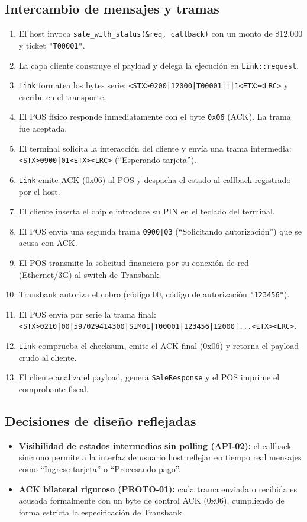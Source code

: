 \documentclass{../../plantilla/raysac-informe}
\begin{document}
\subsection{Intercambio de mensajes y tramas}
\begin{enumerate}
  \item El host invoca \texttt{sale\_with\_status(\&req, callback)} con un monto de \$12.000 y ticket \texttt{"T00001"}.
  \item La capa cliente construye el payload y delega la ejecución en \texttt{Link::request}.
  \item \texttt{Link} formatea los bytes serie: \texttt{<STX>0200|12000|T00001|||1<ETX><LRC>} y escribe en el transporte.
  \item El POS físico responde inmediatamente con el byte \texttt{0x06} (ACK). La trama fue aceptada.
  \item El terminal solicita la interacción del cliente y envía una trama intermedia:
    \texttt{<STX>0900|01<ETX><LRC>} (``Esperando tarjeta'').
  \item \texttt{Link} emite ACK (0x06) al POS y despacha el estado al callback registrado por el host.
  \item El cliente inserta el chip e introduce su PIN en el teclado del terminal.
  \item El POS envía una segunda trama \texttt{0900|03} (``Solicitando autorización'') que se acusa con ACK.
  \item El POS transmite la solicitud financiera por su conexión de red (Ethernet/3G) al switch de Transbank.
  \item Transbank autoriza el cobro (código 00, código de autorización \texttt{"123456"}).
  \item El POS envía por serie la trama final: \texttt{<STX>0210|00|597029414300|SIM01|T00001|123456|12000|...<ETX><LRC>}.
  \item \texttt{Link} comprueba el checksum, emite el ACK final (0x06) y retorna el payload crudo al cliente.
  \item El cliente analiza el payload, genera \texttt{SaleResponse} y el POS imprime el comprobante fiscal.
\end{enumerate}

\subsection{Decisiones de diseño reflejadas}
\begin{itemize}
  \item \textbf{Visibilidad de estados intermedios sin polling (API-02):} el callback síncrono permite
    a la interfaz de usuario host reflejar en tiempo real mensajes como ``Ingrese tarjeta'' o ``Procesando pago''.
  \item \textbf{ACK bilateral riguroso (PROTO-01):} cada trama enviada o recibida es acusada formalmente con
    un byte de control ACK (0x06), cumpliendo de forma estricta la especificación de Transbank.
\end{itemize}
\end{document}
